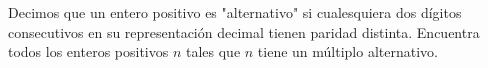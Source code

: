 Decimos que un entero positivo es "alternativo" si cualesquiera dos dígitos consecutivos en su representación decimal tienen paridad distinta. Encuentra todos los enteros positivos $n$ tales que $n$ tiene un múltiplo alternativo.